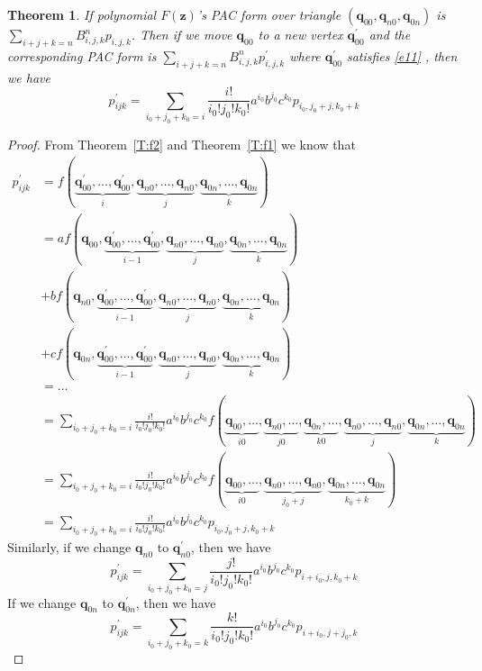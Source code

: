 \documentclass[reqno]{amsart}
\newtheorem{theorem}{Theorem}
\theoremstyle{plain}
\begin{document}
\begin{theorem}
If polynomial $F(\mathbf{z})$'s PAC form over triangle $(\mathbf{q}_{00},\mathbf{q}_{n0},\mathbf{q}_{0n})$ is $\sum_{i+j+k=n}B^{n}_{i,j,k}p_{i,j,k}$. Then if we move $\mathbf{q}_{00}$ to a new vertex $\mathbf{q}^{\prime}_{00}$ and the corresponding PAC form is $\sum_{i+j+k=n}B^{n}_{i,j,k}p^{\prime}_{i,j,k}$ where $\mathbf{q}_{00}^{\prime}$ satisfies \eqref{e11} , then we have
\[
  p^{\prime}_{ijk} = \sum_{i_{0} + j_{0} + k_{0} = i}\frac{i!}{i_{0}!j_{0}!k_{0}!}a^{i_{0}}b^{j_{0}}c^{k_{0}}p_{i_{0},j_{0}+j,k_{0}+k}
\]
\end{theorem}

\begin{proof}
 From Theorem~\ref{T:f2} and Theorem~\ref{T:f1} we know that 
 \begin{align*}
   p^{\prime}_{ijk} &= f(\underbrace{\mathbf{q}^{\prime}_{00},\ldots,\mathbf{q}^{\prime}_{00}}_{i},\underbrace{\mathbf{q}_{n0},\ldots,\mathbf{q}_{n0}}_{j},\underbrace{\mathbf{q}_{0n},\ldots,\mathbf{q}_{0n}}_{k}) \\
   &= af(\mathbf{q}_{00},\underbrace{\mathbf{q}^{\prime}_{00},\ldots,\mathbf{q}^{\prime}_{00}}_{i-1},\underbrace{\mathbf{q}_{n0},\ldots,\mathbf{q}_{n0}}_{j},\underbrace{\mathbf{q}_{0n},\ldots,\mathbf{q}_{0n}}_{k}) \\
   &+
   bf(\mathbf{q}_{n0},\underbrace{\mathbf{q}^{\prime}_{00},\ldots,\mathbf{q}^{\prime}_{00}}_{i-1},\underbrace{\mathbf{q}_{n0},\ldots,\mathbf{q}_{n0}}_{j},\underbrace{\mathbf{q}_{0n},\ldots,\mathbf{q}_{0n}}_{k}) \\ 
   &+
   cf(\mathbf{q}_{0n},\underbrace{\mathbf{q}^{\prime}_{00},\ldots,\mathbf{q}^{\prime}_{00}}_{i-1},\underbrace{\mathbf{q}_{n0},\ldots,\mathbf{q}_{n0}}_{j},\underbrace{\mathbf{q}_{0n},\ldots,\mathbf{q}_{0n}}_{k}) \\
   &= \ldots \\
   &= \sum_{i_{0} + j_{0} + k_{0} = i}\frac{i!}{i_{0}!j_{0}!k_{0}!}a^{i_{0}}b^{j_{0}}c^{k_{0}}f(\underbrace{\mathbf{q}_{00},\ldots}_{i0},\underbrace{\mathbf{q}_{n0},\ldots}_{j0},\underbrace{\mathbf{q}_{0n},\ldots}_{k0},
   \underbrace{\mathbf{q}_{n0},\ldots,\mathbf{q}_{n0}}_{j},\underbrace{\mathbf{q}_{0n},\ldots,\mathbf{q}_{0n}}_{k}) \\
   &= \sum_{i_{0} + j_{0} + k_{0} = i}\frac{i!}{i_{0}!j_{0}!k_{0}!}a^{i_{0}}b^{j_{0}}c^{k_{0}}f(\underbrace{\mathbf{q}_{00},\ldots}_{i0}, \underbrace{\mathbf{q}_{n0},\ldots,\mathbf{q}_{n0}}_{j_{0}+j},\underbrace{\mathbf{q}_{0n},\ldots,\mathbf{q}_{0n}}_{k_{0}+k}) \\
   &= \sum_{i_{0} + j_{0} + k_{0} = i}\frac{i!}{i_{0}!j_{0}!k_{0}!}a^{i_{0}}b^{j_{0}}c^{k_{0}}p_{i_{0},j_{0}+j,k_{0}+k}
\end{align*}
Similarly, if we change $\mathbf{q}_{n0}$ to $\mathbf{q}_{n0}^{\prime}$, then we have
\[
    p^{\prime}_{ijk}= \sum_{i_{0} + j_{0} + k_{0} = j}\frac{j!}{i_{0}!j_{0}!k_{0}!}a^{i_{0}}b^{j_{0}}c^{k_{0}}p_{i+i_{0},j,k_{0}+k}
\]
If we change $\mathbf{q}_{0n}$ to $\mathbf{q}_{0n}^{\prime}$, then we have
\[
    p^{\prime}_{ijk}= \sum_{i_{0} + j_{0} + k_{0} = k}\frac{k!}{i_{0}!j_{0}!k_{0}!}a^{i_{0}}b^{j_{0}}c^{k_{0}}p_{i+i_{0},j+j_{0},k}
\]
\end{proof}
\end{document}
